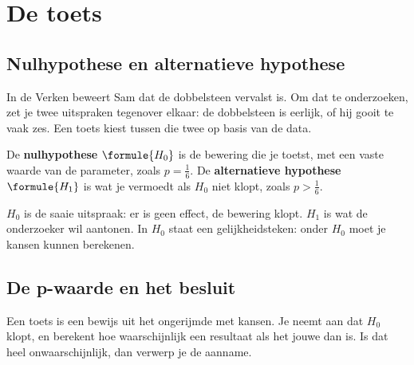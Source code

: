 \section{De toets}

\subsection{Nulhypothese en alternatieve hypothese}

In de Verken beweert Sam dat de dobbelsteen vervalst is. Om dat te onderzoeken, zet je twee uitspraken tegenover elkaar: de dobbelsteen is eerlijk, of hij gooit te vaak zes. Een toets kiest tussen die twee op basis van de data.

\begin{theorie}
De \textbf{\textcolor{accent}{nulhypothese}} $\formule{H_0}$ is de bewering die je toetst, met een vaste waarde van de parameter, zoals $p = \frac16$. De \textbf{\textcolor{accent}{alternatieve hypothese}} $\formule{H_1}$ is wat je vermoedt als $H_0$ niet klopt, zoals $p > \frac16$.
\end{theorie}

$H_0$ is de saaie uitspraak: er is geen effect, de bewering klopt. $H_1$ is wat de onderzoeker wil aantonen. In $H_0$ staat een gelijkheidsteken: onder $H_0$ moet je kansen kunnen berekenen.


\begin{oefeningen}
\end{oefeningen}

\subsection{De p-waarde en het besluit}

Een toets is een bewijs uit het ongerijmde met kansen. Je neemt aan dat $H_0$ klopt, en berekent hoe waarschijnlijk een resultaat als het jouwe dan is. Is dat heel onwaarschijnlijk, dan verwerp je de aanname.

